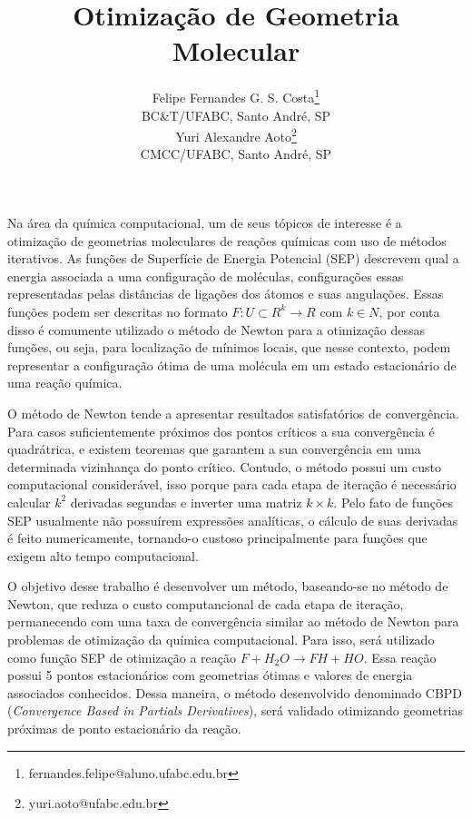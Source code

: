 \documentclass{pssbmac}
\begin{document}

\title{Otimização de Geometria Molecular}

\author{
    {\large Felipe Fernandes G. S. Costa}\thanks{fernandes.felipe@aluno.ufabc.edu.br} \\
    {\small BC\&T/UFABC, Santo André, SP} \\
    {\large Yuri Alexandre Aoto}\thanks{yuri.aoto@ufabc.edu.br} \\
    {\small CMCC/UFABC, Santo André, SP} \\
}
\criartitulo



Na área da química computacional, um de seus tópicos de interesse é a otimização de geometrias moleculares de reações químicas com uso de métodos iterativos. As funções de Superfície de Energia Potencial (SEP) descrevem qual a energia associada a uma configuração de moléculas, configurações essas representadas pelas distâncias de ligações dos átomos e suas angulações. Essas funções podem ser descritas no formato $F: U \subset R^k\to R$ com $k \in N$, por conta disso é comumente utilizado o método de Newton para a otimização dessas funções, ou seja, para localização de mínimos locais, que nesse contexto, podem representar a configuração ótima de uma molécula em um estado estacionário de uma reação química.

O método de Newton tende a apresentar resultados satisfatórios de convergência. Para casos suficientemente próximos dos pontos críticos a sua convergência é quadrátrica, e existem teoremas\cite{calculo_numerico_aplicado} que garantem a sua convergência em uma determinada vizinhança do ponto crítico. Contudo, o método possui um custo computacional considerável, isso porque para cada etapa de iteração é necessário calcular $k^2$ derivadas segundas e inverter uma matriz $k \times k$. Pelo fato de funções SEP usualmente não possuírem expressões analíticas, o cálculo de suas derivadas é feito numericamente, tornando-o custoso principalmente para funções que exigem alto tempo computacional.

O objetivo desse trabalho é desenvolver um método, baseando-se no método de Newton, que reduza o custo computancional de cada etapa de iteração, permanecendo com uma taxa de convergência similar ao método de Newton para problemas de otimização da química computacional. Para isso, será utilizado como função SEP\cite{fh2o_sep_fortran_module} de otimização a reação $F + H_2O \to FH + HO$. Essa reação possui 5 pontos estacionários com geometrias ótimas e valores de energia associados conhecidos\cite{fh2o_first_sep}. Dessa maneira, o método desenvolvido denominado CBPD (\textit{Convergence Based in Partials Derivatives}), será validado otimizando geometrias próximas de ponto estacionário da reação.
\end{document}
